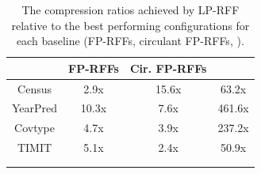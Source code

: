 \begin{table}[ht]
\begin{minipage}{.54\linewidth}
\centering
\vspace{0.42in}
	\begin{tabular}{c c c c}
		\toprule
		& FP-RFFs & Cir. FP-RFFs & \Nystrom \\
		\midrule
		Census & 2.9x & 15.6x & 63.2x \\
		YearPred & 10.3x & 7.6x & 461.6x \\ 
		Covtype & 4.7x & 3.9x & 237.2x \\ 
		TIMIT & 5.1x & 2.4x & 50.9x \\ 
		\bottomrule \\ \\
	\end{tabular}
	\caption{The compression ratios achieved by LP-RFF relative to the best performing configurations for each baseline (FP-RFFs, circulant FP-RFFs, \NystromNS).  
	}
	\label{tab:mem_saving}
\end{minipage}
\hspace{0.22in}
\begin{minipage}{0.4\linewidth}

\end{minipage}
\end{table}

